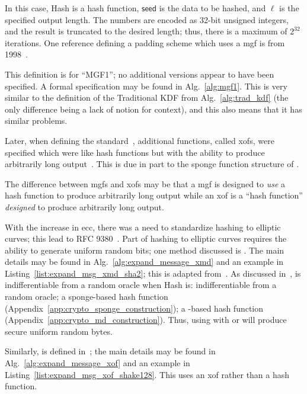 \noindent
In this case, \textsf{Hash} is a hash function,
$\textsf{seed}$ is the data to be hashed,
and $\ell$ is the specified output length.
The numbers are encoded as 32-bit unsigned integers,
and the result is truncated to the desired length;
thus, there is a  maximum of $2^{32}$ iterations.
One reference defining a padding scheme which uses
a \gls{mgf} is from 1998~\cite{rfc2437}.

This definition is for ``MGF1'';
no additional versions appear to have been specified.
A formal specification may be found in Alg.~\ref{alg:mgf1}.
This is very similar to the definition
of the Traditional KDF from Alg.~\ref{alg:trad_kdf}
(the only difference being a lack of notion for context),
and this also means that it has similar problems.



Later, when defining the \ShaThree{} standard~\cite{FIPS-202},
additional functions, called \glspl{xof},
were specified which were like \glspl{hash function}
but with the ability to produce
arbitrarily long output~\cite[Section 6.2]{FIPS-202}.
This is due in part to the sponge function structure of \ShaThree{}.

The difference between \glspl{mgf} and \glspl{xof}
may be that a \gls{mgf} is designed to \emph{use} a \gls{hash function}
to produce arbitrarily long output
while an \gls{xof} is a ``hash function'' \emph{designed}
to produce arbitrarily long output.

With the increase in \gls{ecc},
there was a need to standardize hashing to \glspl{elliptic curve};
this lead to RFC 9380~\cite{rfc9380}.
Part of hashing to \glspl{elliptic curve} requires the ability
to generate uniform random bits;
one method discussed is \ExpandMsgXmd{}.
The main details may be found in Alg.~\ref{alg:expand_message_xmd}
and an example in Listing~\ref{list:expand_msg_xmd_sha2};
this is adapted from~\cite[Section 5.3.1]{rfc9380}.
As discussed in~\cite[Section 10.6]{rfc9380},
\ExpandMsgXmd{} is indifferentiable from a \gls{random oracle}
when \textsf{Hash} is:
indifferentiable from a \gls{random oracle};
a sponge-based hash function (Appendix~\ref{app:crypto_sponge_construction});
a \MD{}-based hash function (Appendix~\ref{app:crypto_md_construction}).
Thus, using \ExpandMsgXmd{} with \ShaTwo{} or \ShaThree{}
will produce secure uniform random bytes.




Similarly, \ExpandMsgXof{} is defined
in~\cite[Section 5.3.2]{rfc9380};
the main details may be found in Alg.~\ref{alg:expand_message_xof}
and an example in Listing~\ref{list:expand_msg_xof_shake128}.
This uses an \gls{xof} rather than a hash function.

